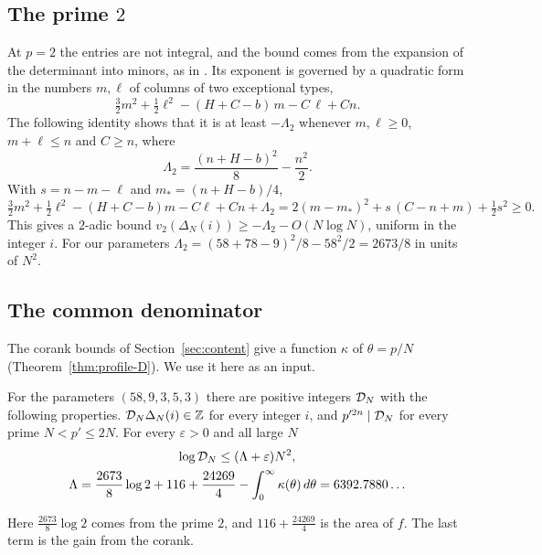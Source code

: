 \subsection{The prime $2$}
At $p=2$ the entries are not integral, and the bound comes from the expansion of the determinant into
minors, as in \cite[\S3]{OpenAI2026}. Its exponent is governed by a quadratic form in the numbers $m,\ell$
of columns of two exceptional types,
\[
 \tfrac32m^2+\tfrac12\ell^2-(H+C-b)\,m-C\,\ell+Cn .
\]
The following identity shows that it is at least $-\Lambda_2$ whenever $m,\ell\ge0$, $m+\ell\le n$ and
$C\ge n$, where
\begin{equation}\label{eq:A2}
 \Lambda_2=\frac{(n+H-b)^2}8-\frac{n^2}2 .
\end{equation}
With $s=n-m-\ell$ and $m_*=(n+H-b)/4$,
\[
 \tfrac32m^2+\tfrac12\ell^2-(H+C-b)m-C\ell+Cn+\Lambda_2
 =2(m-m_*)^2+s\,(C-n+m)+\tfrac12s^2\ge0 .
\]
This gives a $2$-adic bound $v_2(\Delta_N(i))\ge-\Lambda_2-O(N\log N)$, uniform in the integer $i$. For our
parameters $\Lambda_2=(58+78-9)^2/8-58^2/2=2673/8$ in units of $N^2$.

\subsection{The common denominator}
The corank bounds of Section~\ref{sec:content} give a function $\kappa$ of $\theta=p/N$
(Theorem~\ref{thm:profile-D}). We use it here as an input.

\begin{proposition}\label{prop:denominators}
For the parameters $(58,9,3,5,3)$ there are positive integers $\mathcal D_N$ with the following properties.
$\mathcal D_N\Delta_N(i)\in\mathbb Z$ for every integer $i$, and $p'^{2n}\mid\mathcal D_N$ for every prime $N<p'\le2N$. For every
$\varepsilon>0$ and all large $N$
\begin{gather*}
 \log\mathcal D_N\le(\Lambda+\varepsilon)N^2,\\
 \Lambda=\frac{2673}8\log2+116+\frac{24269}4-\int_0^\infty\kappa(\theta)\,d\theta=6392.7880\ldots
\end{gather*}
\end{proposition}

Here $\frac{2673}8\log2$ comes from the prime $2$, and $116+\frac{24269}4$ is the area of $f$. The last term
is the gain from the corank.

